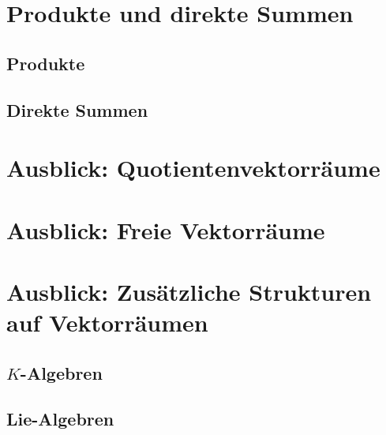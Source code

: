 \section{Produkte und direkte Summen}


\subsection{Produkte}


\subsection{Direkte Summen}



\section{Ausblick: Quotientenvektorräume}



\section{Ausblick: Freie Vektorräume}



\section{Ausblick: Zusätzliche Strukturen auf Vektorräumen}


\subsection{\texorpdfstring{$K$}{K}-Algebren}


\subsection{Lie-Algebren}






